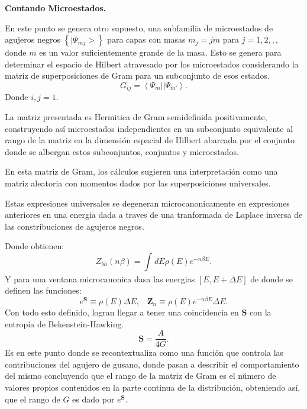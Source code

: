 \documentclass[letterpaper]{article}
\begin{document}
\newpage
\begin{justify}
\textbf{Contando Microestados.}
\end{justify}
\begin{justify}
En este punto se genera otro supuesto, una subfamilia de microestados de agujeros negros \(\left\{ |\Psi_{mj}>  \right\}\) para capas con masas
\(m_j = jm\) para \(j=1,2,,,\) donde \(m\) es un valor suficientemente grande de la masa. Esto se genera para determinar el espacio de Hilbert atravesado por los microestados considerando
la matriz de superposiciones de Gram para un subconjunto de esos estados. \[G_{ij}=\left< \Psi_m || \Psi_{m'} \right>.\] 
Donde \(i,j=1\). 
\end{justify}
\begin{justify}
La matriz presentada es Hermitica de Gram semidefinida positivamente, construyendo así microestados independientes en un subconjunto equivalente al rango de la matriz en la dimensión espacial
de Hilbert abarcada por el conjunto donde se albergan estos subconjuntos, conjuntos y microestados.
\end{justify}
\begin{justify}
En esta matriz de Gram, los cálculos sugieren una interpretación como una matriz aleatoria con momentos dados por las superposiciones universales.
\end{justify}
\begin{justify}
Estas expresiones universales se degeneran microcanonicamente en expresiones anteriores en una energia dada a traves de una tranformada de Laplace inversa de las constribuciones de agujeros negros.
\end{justify}
\begin{justify}
Donde obtienen: \[Z_{bh}(n\beta)=\int_{}^{} dE\rho(E)e^{-n\beta E}.\]
Y para una ventana microcanonica dasa las energias  \([E,E+\Delta E]\) de donde se definen las
funciones: \[e^{\textbf{S}}\equiv \rho (E)\Delta E, \; \; \; \textbf{Z}_n \equiv \rho (E)e^{-n\beta E}\Delta E.\]
Con todo esto definido, logran llegar a tener una coincidencia en \(\textbf{S}\) con la entropía de Bekenstein-Hawking.
\[\textbf{S}=\frac{A}{4G}.\] Es en este punto donde se recontextualiza  como una función que controla las contribuciones del agujero de gusano, donde pasan a describir el comportamiento del mismo
concluyendo que el rango de la matriz de Gram es el número de valores propios contenidos en la parte continua de la distribución, obteniendo así, que el rango de \(G\) es dado por \(e^{\textbf{S}}.\)
\end{justify}
\end{document}
